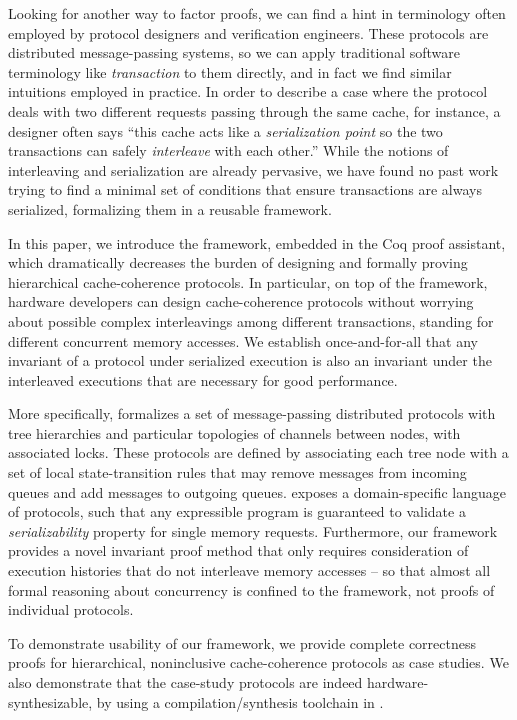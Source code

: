 \documentclass[sigplan,10pt,review,anonymous,screen]{acmart}\settopmatter{printfolios=true,printccs=false,printacmref=false}
\begin{document}
Looking for another way to factor proofs, we can find a hint in terminology often employed by protocol designers and verification engineers.
These protocols are distributed message-passing systems, so we can apply traditional software terminology like \emph{transaction} to them directly, and in fact we find similar intuitions employed in practice.
In order to describe a case where the protocol deals with two different requests passing through the same cache, for instance, a designer often says ``this cache acts like a \emph{serialization point} so the two transactions can safely \emph{interleave} with each other.''
While the notions of interleaving and serialization are already pervasive, we have found no past work trying to find a minimal set of conditions that ensure transactions are always serialized, formalizing them in a reusable framework.

In this paper, we introduce the \hemiola{} framework, embedded in the Coq proof assistant, which dramatically decreases the burden of designing and formally proving hierarchical cache-coherence protocols.
In particular, on top of the framework, hardware developers can design cache-coherence protocols without worrying about possible complex interleavings among different transactions, standing for different concurrent memory accesses.
We establish once-and-for-all that any invariant of a protocol under serialized execution is also an invariant under the interleaved executions that are necessary for good performance.

More specifically, \hemiola{} formalizes a set of message-passing distributed protocols with tree hierarchies and particular topologies of channels between nodes, with associated locks.
These protocols are defined by associating each tree node with a set of local state-transition rules that may remove messages from incoming queues and add messages to outgoing queues.
\hemiola{} exposes a domain-specific language of protocols, such that any expressible program is guaranteed to validate a \emph{serializability} property for single memory requests.
Furthermore, our framework provides a novel invariant proof method that only requires consideration of execution histories that do not interleave memory accesses -- so that almost all formal reasoning about concurrency is confined to the framework, not proofs of individual protocols.

To demonstrate usability of our framework, we provide complete correctness proofs for hierarchical, noninclusive cache-coherence protocols as case studies.
We also demonstrate that the case-study protocols are indeed hardware-synthesizable, by using a compilation/synthesis toolchain in \hemiola{}.
\end{document}
